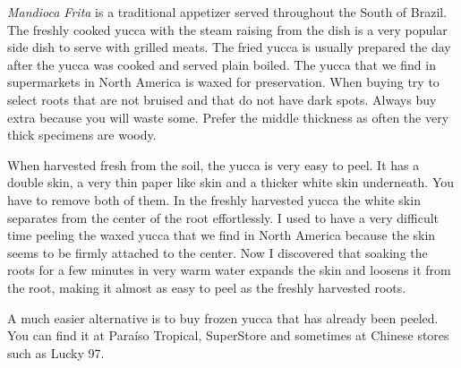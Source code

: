 \documentclass[11pt,letterpaper]{article}
\begin{document}


{\em Mandioca Frita} is a traditional appetizer served throughout the
South of Brazil. The freshly cooked yucca with the steam raising from
the dish is a very popular side dish to serve with grilled meats. The
fried yucca is usually prepared the day after the yucca was cooked and
served plain boiled. The yucca that we find in supermarkets in North
America is waxed for preservation. When buying try to select roots
that are not bruised and that do not have dark spots. Always buy extra
because you will waste some. Prefer the middle thickness as often the
very thick specimens are woody.

When harvested fresh from the soil, the yucca is very easy to peel. It
has a double skin, a very thin paper like skin and a thicker white
skin underneath. You have to remove both of them. In the freshly
harvested yucca the white skin separates from the center of the root
effortlessly. I used to have a very difficult time peeling the waxed
yucca that we find in North America because the skin seems to be
firmly attached to the center. Now I discovered that soaking the roots
for a few minutes in very warm water expands the skin and loosens it
from the root, making it almost as easy to peel as the freshly
harvested roots.

A much easier alternative is to buy frozen yucca that has already been peeled. You can find it at Para\'iso Tropical, SuperStore and sometimes at Chinese stores such as Lucky 97.
\end{document}
